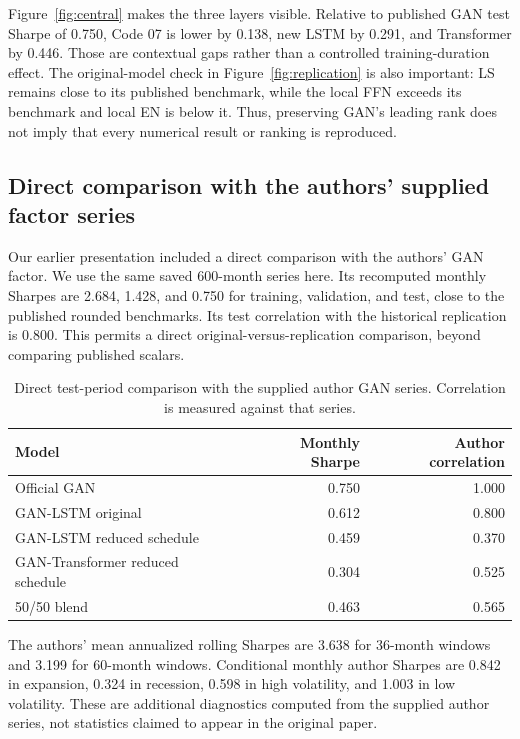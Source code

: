 \documentclass[11pt]{article}
\begin{document}
Figure~\ref{fig:central} makes the three layers visible. Relative to published GAN test Sharpe of 0.750, Code 07 is lower by 0.138, new LSTM by 0.291, and Transformer by 0.446. Those are contextual gaps rather than a controlled training-duration effect. The original-model check in Figure~\ref{fig:replication} is also important: LS remains close to its published benchmark, while the local FFN exceeds its benchmark and local EN is below it. Thus, preserving GAN's leading rank does not imply that every numerical result or ranking is reproduced.

\clearpage\subsection{Direct comparison with the authors' supplied factor series}
Our earlier presentation included a direct comparison with the authors' GAN factor. We use the same saved 600-month series here. Its recomputed monthly Sharpes are 2.684, 1.428, and 0.750 for training, validation, and test, close to the published rounded benchmarks. Its test correlation with the historical replication is 0.800. This permits a direct original-versus-replication comparison, beyond comparing published scalars.

\begin{table}[htbp]\centering\small\caption{Direct test-period comparison with the supplied author GAN series. Correlation is measured against that series.}\label{tab:official}\begin{tabular}{lrr}\toprule Model & Monthly Sharpe & Author correlation \\\midrule
Official GAN & 0.750 & 1.000 \\
GAN-LSTM original & 0.612 & 0.800 \\
GAN-LSTM reduced schedule & 0.459 & 0.370 \\
GAN-Transformer reduced schedule & 0.304 & 0.525 \\
50/50 blend & 0.463 & 0.565 \\
\bottomrule\end{tabular}\end{table}
The authors' mean annualized rolling Sharpes are 3.638 for 36-month windows and 3.199 for 60-month windows. Conditional monthly author Sharpes are 0.842 in expansion, 0.324 in recession, 0.598 in high volatility, and 1.003 in low volatility. These are additional diagnostics computed from the supplied author series, not statistics claimed to appear in the original paper.
\end{document}
